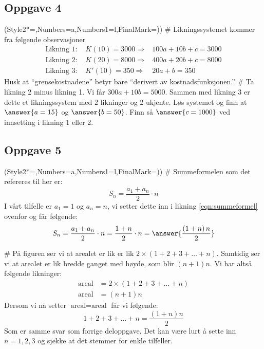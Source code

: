 \subsection*{Oppgave 4}
\begin{easylist}[enumerate]
	\ListProperties(Style2*=,Numbers=a,Numbers1=l,FinalMark={)})
	# Likningssystemet kommer fra følgende observasjoner
	\begin{align*}
	\text{Likning 1: }&K(10) = 3000\Rightarrow & 100a + 10b + c = 3000 \\
	\text{Likning 2: }&K(20) = 8000 \Rightarrow & 400a + 20b + c = 8000 \\
	\text{Likning 3: }&K'(10) = 350 \Rightarrow & 20a + b = 350 
	\end{align*}
	Husk at ``grensekostnadene'' betyr bare ``derivert av kostnadsfunksjonen.''
	# Ta likning 2 minus likning 1. Vi får $300a + 10b = 5000$. 
	Sammen med likning 3 er dette et likningssystem med 2 likninger og 2 ukjente. 
	Løs systemet og finn at $\answer{a = 15}$ og $\answer{b = 50}$. 
	Finn så $\answer{c = 1000}$ ved innsetting i likning 1 eller 2.
\end{easylist}

\subsection*{Oppgave 5}
\begin{easylist}[enumerate]
	\ListProperties(Style2*=,Numbers=a,Numbers1=l,FinalMark={)})
	# Summeformelen som det refereres til her er:
	\begin{equation}
	\label{eqn:summeformel}
	S_n = \frac{a_1 + a_n}{2} \cdot n
	\end{equation}
	I vårt tilfelle er $a_1 = 1$ og $a_n = n$, vi setter dette inn i likning \eqref{eqn:summeformel} ovenfor og får følgende:
	\begin{equation*}
	S_n = \frac{a_1 + a_n}{2} \cdot n = \frac{1 + n}{2} \cdot n = \answer{\frac{\left(1+n\right)n}{2}}
	\end{equation*}
	
	# På figuren ser vi at arealet er lik er lik $2 \times \left( 1+2+3+ \dots +n \right)$. 
	Samtidig ser vi at arealet er lik bredde ganget med høyde, som blir $(n+1)n$. 
	Vi har altså følgende likninger:
	\begin{align*}
	\text{areal} &= 2 \times \left( 1+2+3+ \dots +n \right)  \\
	\text{areal} &= (n+1)n 
	\end{align*}
	Dersom vi nå setter $\text{areal} = \text{areal}$ får vi følgende:
	\begin{equation*}
	1+2+3+ \dots +n = \frac{\left(1+n\right)n}{2}
	\end{equation*}
	Som er samme svar som forrige deloppgave. 
	Det kan være lurt å sette inn $n = 1,2,3$ og sjekke at det stemmer for enkle tilfeller.
\end{easylist}

